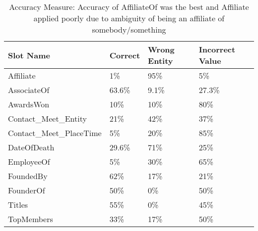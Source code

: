 \begin{table}[t]
\caption{Accuracy Measure: Accuracy of AffiliateOf was the best and Affiliate applied poorly due to ambiguity of being an affiliate of somebody/something}
\centering
\label{table:finalresultaccuracy}
\begin{tabular}{|l|p{10mm}|p{10mm}|p{11mm}|}
\hline 
 \textbf{Slot Name}  & \textbf{Correct} & \textbf{Wrong Entity} & {\small \textbf{Incorrect Value}} \\ 
\hline 
Affiliate & 1\% & 95\% & 5\% \\ \hline 
AssociateOf & 63.6\% & 9.1\% & 27.3\%  \\ \hline 
AwardsWon & 10\% & 10\% & 80\%  \\ \hline 
Contact\_Meet\_Entity & 21\% & 42\% & 37\%  \\ \hline 
Contact\_Meet\_PlaceTime & 5\% & 20\% & 85\%  \\ \hline 
DateOfDeath & 29.6\% & 71\% & 25\%  \\ \hline 
EmployeeOf & 5\% & 30\% & 65\%  \\ \hline 
FoundedBy & 62\% & 17\% & 21\%  \\ \hline 
FounderOf & 50\% & 0\% & 50\%  \\ \hline 
Titles & 55\% & 0\% & 45\%  \\ \hline 
TopMembers & 33\% & 17\% & 50\%  \\ \hline 

\end{tabular} 
\end{table}









